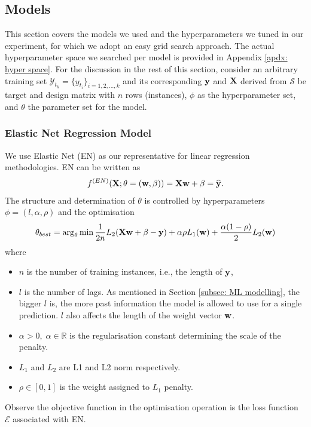 \subsection{Models}\label{subsec: models}
This section covers the models we used and the hyperparameters we tuned in our experiment, for which we adopt an easy grid search approach. The actual hyperparameter space we searched per model is provided in Appendix \ref{apdx: hyper space}. For the discussion in the rest of this section, consider an arbitrary training set $\mathcal{Y}_{t_k} = \{y_{t_i} \}_{i = 1, 2, \ldots, k}$ and its corresponding $\mathbf{y}$ and $\mathbf{X}$ derived from $\mathcal{S}$ be target and design matrix with $n$ rows (instances), $\phi$ as the hyperparameter set, and $\theta$ the parameter set for the model.

\subsubsection{Elastic Net Regression Model}
We use Elastic Net (EN) as our representative for linear regression methodologies. EN can be written as
\begin{gather*}
    f^{(EN)} (\mathbf{X} ; \theta = (\mathbf{w}, \mathbf{\beta})) = \mathbf{X} \mathbf{w} + \mathbf{\beta} = \widehat{\mathbf{y}}.
\end{gather*}
The structure and determination of $\theta$ is controlled by hyperparameters $\phi = (l, \alpha, \rho)$ and the optimisation
\begin{equation*}
    \theta_{best} = \arg_{\theta} \min \frac{1}{2n} L_2(\mathbf{X} \mathbf{w} + \mathbf{\beta} - \mathbf{y}) + \alpha \rho L_1(\mathbf{w}) + \frac{\alpha (1 - \rho)}{2} L_2(\mathbf{w})
\end{equation*}
where
\begin{itemize}
    \item $n$ is the number of training instances, i.e., the length of $\mathbf{y}$,
    \item $l$ is the number of lags. As mentioned in Section \ref{subsec: ML modelling}, the bigger $l$ is, the more past information the model is allowed to use for a single prediction. $l$ also affects the length of the weight vector $\mathbf{w}$.
    \item $\alpha > 0, \; \alpha \in \mathbb{R}$ is the regularisation constant determining the scale of the penalty.
    \item $L_1$ and $L_2$ are L1 and L2 norm respectively.
    \item $\rho \in [0, 1]$ is the weight assigned to $L_1$ penalty.
\end{itemize}
Observe the objective function in the optimisation operation is the loss function $\mathcal{E}$ associated with EN.


